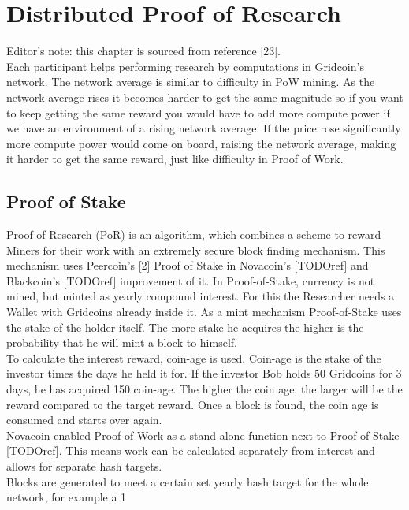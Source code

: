 \section{Distributed Proof of Research}

Editor's note: this chapter is sourced from reference [23].\\

Each participant helps performing research by computations in Gridcoin's network. The network average is similar to difficulty in PoW mining. As the network average rises it becomes harder to get the same magnitude so if you want to keep getting the same reward you would have to add more compute power if we have an environment of a rising network average. If the price rose significantly more compute power would come on board, raising the network average, making it harder to get the same reward, just like difficulty in Proof of Work.

\subsection{Proof of Stake}

Proof-of-Research (PoR) is an algorithm, which combines a scheme to reward Miners for their work with an extremely secure block finding mechanism. This mechanism uses Peercoin's [2] Proof of Stake in Novacoin's [TODOref] and Blackcoin's [TODOref] improvement of it. In Proof-of-Stake, currency is not mined, but minted as yearly compound interest. For this the Researcher needs a Wallet with Gridcoins already inside it. As a mint mechanism Proof-of-Stake uses the stake of the holder itself. The more stake he acquires the higher is the probability that he will mint a block to himself.\\

To calculate the interest reward, coin-age is used. Coin-age is the stake of the investor times the days he held it for. If the investor Bob holds 50 Gridcoins for 3 days, he has acquired 150 coin-age. The higher the coin age, the larger will be the reward compared to the target reward. Once a block is found, the coin age is consumed and starts over again.\\

Novacoin enabled Proof-of-Work as a stand alone function next to Proof-of-Stake [TODOref]. This means work can be calculated separately from interest and allows for separate hash targets.\\

Blocks are generated to meet a certain set yearly hash target for the whole network, for example a 1%


